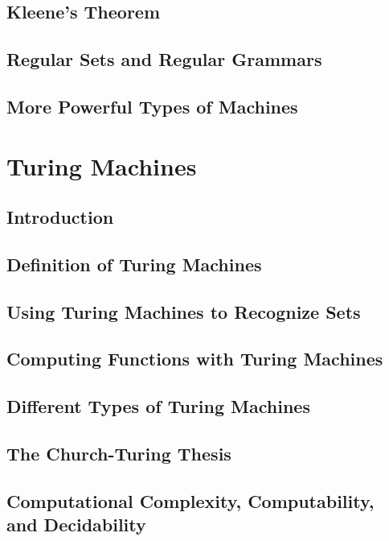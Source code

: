 \documentclass[11pt]{book}
\begin{document}
  \subsection{Kleene's Theorem}
  \subsection{Regular Sets and Regular Grammars}
  \subsection{More Powerful Types of Machines}
  
 \section{Turing Machines}
  \subsection{Introduction}
  \subsection{Definition of Turing Machines}
  \subsection{Using Turing Machines to Recognize Sets}
  \subsection{Computing Functions with Turing Machines}
  \subsection{Different Types of Turing Machines}
  \subsection{The Church-Turing Thesis}
  \subsection{Computational Complexity, Computability, and Decidability}
\end{document}
